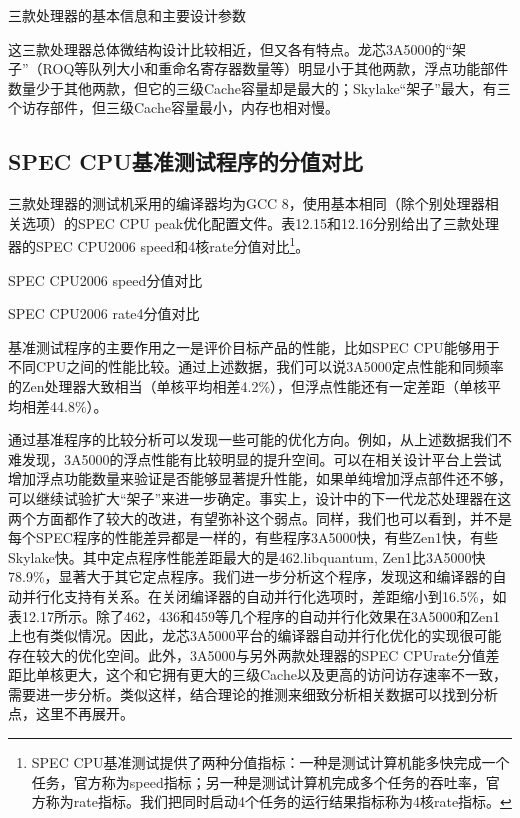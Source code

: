 \documentclass[]{ctexbook}
\begin{document}
\label{tab:cpu-params}三款处理器的基本信息和主要设计参数

这三款处理器总体微结构设计比较相近，但又各有特点。龙芯3A5000的``架子''（ROQ等队列大小和重命名寄存器数量等）明显小于其他两款，浮点功能部件数量少于其他两款，但它的三级Cache容量却是最大的；Skylake``架子''最大，有三个访存部件，但三级Cache容量最小，内存也相对慢。

\hypertarget{spec-cpuux57faux51c6ux6d4bux8bd5ux7a0bux5e8fux7684ux5206ux503cux5bf9ux6bd4}{%
\subsection{SPEC CPU基准测试程序的分值对比}\label{spec-cpuux57faux51c6ux6d4bux8bd5ux7a0bux5e8fux7684ux5206ux503cux5bf9ux6bd4}}

三款处理器的测试机采用的编译器均为GCC 8，使用基本相同（除个别处理器相关选项）的SPEC CPU peak优化配置文件。表12.15和12.16分别给出了三款处理器的SPEC CPU2006 speed和4核rate分值对比\footnote{SPEC CPU基准测试提供了两种分值指标：一种是测试计算机能多快完成一个任务，官方称为speed指标；另一种是测试计算机完成多个任务的吞吐率，官方称为rate指标。我们把同时启动4个任务的运行结果指标称为4核rate指标。}。

\label{tab:2006speed}SPEC CPU2006 speed分值对比

\label{tab:2006rate4}SPEC CPU2006 rate4分值对比

基准测试程序的主要作用之一是评价目标产品的性能，比如SPEC CPU能够用于不同CPU之间的性能比较。通过上述数据，我们可以说3A5000定点性能和同频率的Zen处理器大致相当（单核平均相差4.2\%），但浮点性能还有一定差距（单核平均相差44.8\%）。

通过基准程序的比较分析可以发现一些可能的优化方向。例如，从上述数据我们不难发现，3A5000的浮点性能有比较明显的提升空间。可以在相关设计平台上尝试增加浮点功能数量来验证是否能够显著提升性能，如果单纯增加浮点部件还不够，可以继续试验扩大``架子''来进一步确定。事实上，设计中的下一代龙芯处理器在这两个方面都作了较大的改进，有望弥补这个弱点。同样，我们也可以看到，并不是每个SPEC程序的性能差异都是一样的，有些程序3A5000快，有些Zen1快，有些Skylake快。其中定点程序性能差距最大的是462.libquantum, Zen1比3A5000快78.9\%，显著大于其它定点程序。我们进一步分析这个程序，发现这和编译器的自动并行化支持有关系。在关闭编译器的自动并行化选项时，差距缩小到16.5\%，如表12.17所示。除了462，436和459等几个程序的自动并行化效果在3A5000和Zen1上也有类似情况。因此，龙芯3A5000平台的编译器自动并行化优化的实现很可能存在较大的优化空间。此外，3A5000与另外两款处理器的SPEC CPUrate分值差距比单核更大，这个和它拥有更大的三级Cache以及更高的访问访存速率不一致，需要进一步分析。类似这样，结合理论的推测来细致分析相关数据可以找到分析点，这里不再展开。
\end{document}
